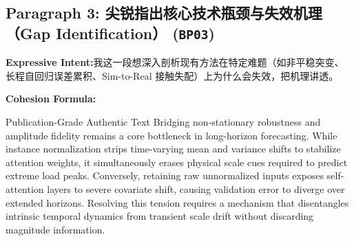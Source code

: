 \subsection*{Paragraph 3: 尖锐指出核心技术瓶颈与失效机理（Gap Identification） (\texttt{BP03})}
\noindent\textbf{Expressive Intent:}\enspace 我这一段想深入剖析现有方法在特定难题（如非平稳突变、长程自回归误差累积、Sim-to-Real 接触失配）上为什么会失效，把机理讲透。\par
\noindent\textbf{Cohesion Formula:}\par\vspace{4pt}
\begin{ExampleBox}{Publication-Grade Authentic Text}
Bridging non-stationary robustness and amplitude fidelity remains a core bottleneck in long-horizon forecasting. While instance normalization strips time-varying mean and variance shifts to stabilize attention weights, it simultaneously erases physical scale cues required to predict extreme load peaks. Conversely, retaining raw unnormalized inputs exposes self-attention layers to severe covariate shift, causing validation error to diverge over extended horizons. Resolving this tension requires a mechanism that disentangles intrinsic temporal dynamics from transient scale drift without discarding magnitude information.
\end{ExampleBox}
